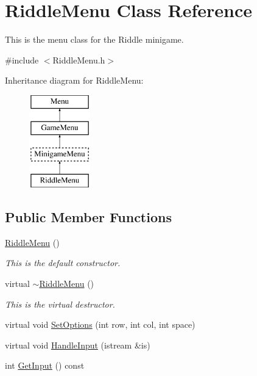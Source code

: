 \hypertarget{classRiddleMenu}{\section{Riddle\-Menu Class Reference}
\label{classRiddleMenu}
}


This is the menu class for the Riddle minigame.  




{\ttfamily \#include $<$Riddle\-Menu.\-h$>$}

Inheritance diagram for Riddle\-Menu\-:\begin{figure}[H]
\begin{center}
\leavevmode
\includegraphics[height=4.000000cm]{classRiddleMenu}
\end{center}
\end{figure}
\subsection*{Public Member Functions}
\begin{DoxyCompactItemize}
\item 
\hyperlink{classRiddleMenu_a68e4be3bbc49bdb2f3d8a9fda74614d9}{Riddle\-Menu} ()
\begin{DoxyCompactList}\small\item\em This is the default constructor. \end{DoxyCompactList}\item 
virtual \hyperlink{classRiddleMenu_a9366deb179c1145947e37d599216d64e}{$\sim$\-Riddle\-Menu} ()
\begin{DoxyCompactList}\small\item\em This is the virtual destructor. \end{DoxyCompactList}\item 
virtual void \hyperlink{classRiddleMenu_a2d103283c58744ffa0e77e62a24e7ccb}{Set\-Options} (int row, int col, int space)
\item 
virtual void \hyperlink{classRiddleMenu_aef67f984c1aad0b8240e03b43ccbe615}{Handle\-Input} (istream \&is)
\item 
int \hyperlink{classRiddleMenu_a462f8a9d922e228c61619396e6ee8dc2}{Get\-Input} () const 
\end{DoxyCompactItemize}
